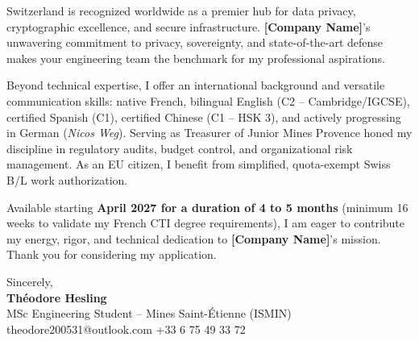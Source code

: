 \documentclass[10.5pt,a4paper]{article}
\begin{document}
Switzerland is recognized worldwide as a premier hub for data privacy, cryptographic excellence, and secure infrastructure. \textbf{[Company Name]}'s unwavering commitment to privacy, sovereignty, and state-of-the-art defense makes your engineering team the benchmark for my professional aspirations.

Beyond technical expertise, I offer an international background and versatile communication skills: native French, bilingual English (C2 -- Cambridge/IGCSE), certified Spanish (C1), certified Chinese (C1 -- HSK 3), and actively progressing in German (\textit{Nicos Weg}). Serving as Treasurer of Junior Mines Provence honed my discipline in regulatory audits, budget control, and organizational risk management. As an EU citizen, I benefit from simplified, quota-exempt Swiss B/L work authorization.

Available starting \textbf{April 2027 for a duration of 4 to 5 months} (minimum 16 weeks to validate my French CTI degree requirements), I am eager to contribute my energy, rigor, and technical dedication to \textbf{[Company Name]}'s mission. Thank you for considering my application.

\vspace{14pt}
\noindent Sincerely,\\[18pt]
\textbf{Théodore Hesling}\\[2pt]
{\small MSc Engineering Student -- Mines Saint-Étienne (ISMIN)\\
theodore200531@outlook.com \quad +33 6 75 49 33 72}
\end{document}
